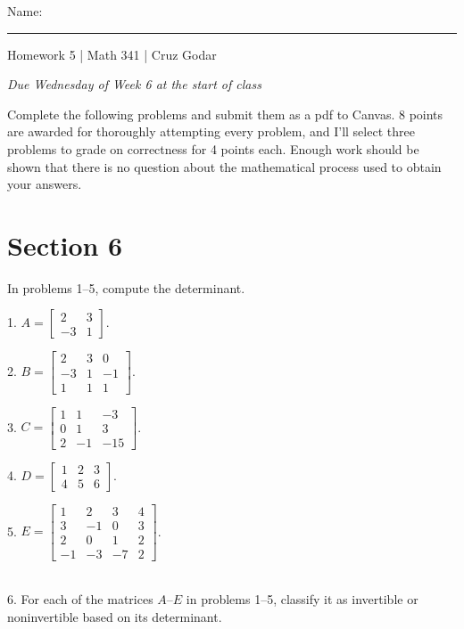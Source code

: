 \documentclass{article}
\begin{document}
\Large Name: \rule{2in}{0.15mm} \hfill Homework 5 | Math 341 | Cruz Godar \vspace{4pt}  \normalsize

\textit{Due Wednesday of Week 6 at the start of class}

Complete the following problems and submit them as a pdf to Canvas. 8 points are awarded for thoroughly attempting every problem, and I'll select three problems to grade on correctness for 4 points each. Enough work should be shown that there is no question about the mathematical process used to obtain your answers.

\section{Section 6}

In problems 1--5, compute the determinant.

1. $\displaystyle A = \left[\begin{array}{cc} 2& 3 \\ -3& 1 \end{array}\right]$.

2. $\displaystyle B = \left[\begin{array}{ccc} 2& 3& 0 \\ -3& 1& -1 \\ 1& 1& 1 \end{array}\right]$.

3. $\displaystyle C = \left[\begin{array}{ccc} 1& 1& -3 \\ 0& 1& 3 \\ 2& -1& -15 \end{array}\right]$.

4. $\displaystyle D = \left[\begin{array}{ccc} 1& 2& 3 \\ 4& 5& 6 \end{array}\right]$.

5. $\displaystyle E = \left[\begin{array}{cccc} 1& 2& 3& 4 \\ 3& -1& 0& 3 \\ 2& 0& 1& 2\\ -1& -3& -7& 2 \end{array}\right]$. 

~\\

6. For each of the matrices $A$--$E$ in problems 1--5, classify it as invertible or noninvertible based on its determinant. 
\end{document}
